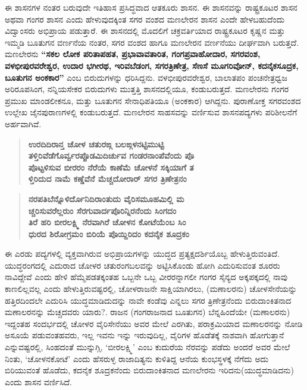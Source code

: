 ಈ ಶಾಸನಗಳ ನಂತರ ಬರುವುದೇ ಇತಿಹಾಸ ಪ್ರಸಿದ್ಧವಾದ ಆತಕೂರು ಶಾಸನ. ಈ ಶಾಸನವನ್ನು ರಾಷ್ಟ್ರಕೂಟರ ಶಾಸನ ಅಥವಾ ಗಂಗರ ಶಾಸನ ಎಂದು ಹೇಳುವುದಕ್ಕಿಂತ ಸಗರ ವಂಶದ ಮಣಲೇರನ ಶಾಸನ ಎಂದೇ ಹೇಳಬಹುದೆಂದು ವಿದ್ವಾಂಸರು ಅಭಿಪ್ರಾಯ ಪಡುತ್ತಾರೆ. ಈ ಶಾಸನದಲ್ಲಿ ಮೊದಲಿಗೆ ಚಕ್ರವರ್ತಿಯಾದ ರಾಷ್ಟ್ರಕೂಟರ ಕೃಷ್ಣನ ಮತ್ತು ಇಮ್ಮಡಿ ಬೂತುಗನ ವರ್ಣನೆಯ ನಂತರ, ಸಗರ ವಂಶದ ಹಾಗೂ ಮಣಲೇರನ ವರ್ಣನೆಯು ದೀರ್ಘವಾಗಿ ಬರುತ್ತದೆ. ಮಣಲೇರನು \textbf{“ಸಕಲ ಲೋಕ ಪರಿತಾಪಹತ, ಪ್ರಭಾವಾವತಾರಿತ, ಗಂಗಪ್ರವಾಹೋದಾರ, ಸಗರವಂಶ, ವಳಭೀಪುರವರೇಶ್ವರ, ಉದಾರ ಭಗೀರಥ, ಇರಿವಬೆಡಂಗ, ಸಗರತ್ರಿಣೇತ್ರ, ಸೆಣಸೆ ಮೂಗರಿವೋನ್​, ಕದನೈಕಸೂದ್ರಕ, ಬೂತುಗನ ಅಂಕಕಾರ”} ಎಂಬ ಬಿರುದುಗಳನ್ನು ಧರಿಸಿದ್ದನು. ವಳಭೀಪುರವರೇಶ್ವರ, ಬಾಲಾತಪಂ ಪಂಚನೇತ್ರಧ್ವಜ ಅರಿರೂಪಸಿಂಗ, ನನ್ನಿಯಸೇಕರ ಬಿರುದುಗಳು ಮುತ್ತತ್ತಿ ಶಾಸನದಲ್ಲಿಯೂ, ಕಂಡುಬರುತ್ತದೆ. ಮಣಲೇರನು ಗಂಗರ ಪ್ರಮುಖ ಮಾಂಡಲೀಕನೂ, ಮತ್ತು ಬೂತುಗನ ಸೇನಾಧಿಪತಿಯೂ (ಅಂಕಕಾರ) ಆಗಿದ್ದನು. ಪುರಾಣೋಕ್ತ ಸಗರವಂಶದ ಉಲ್ಲೇಖ ಜೈನಪುರಾಣಗಳಲ್ಲಿ ಕಂಡುಬರುತ್ತದೆ. ಮಣಲೇರನ ಸಾಹಸವನ್ನು ವರ್ಣಿಸುವ ಶಾಸನಪದ್ಯಗಳು ಪರಿಶೀಲನೆಗೆ ಅರ್ಹವಾಗಿವೆ.

\begin{verse}
\textbf{ಉರದಿದಿರಾನ್ತ ಚೋಳ ಚತುರಙ್ಗ ಬಲಙ್ಗಳನಟ್ಟಿಮುಟ್ಟಿ} \\\textbf{ತಳ್ತಿರಿವೆಡೆಗೊರ್ವ್ವರಪ್ಪೊಡಮಿದಿರ್ಚುವ ಗಂಡರನಾಂಪೆವೆಂದು ಪೊ} \\\textbf{ಪೊಟ್ಟಳಿಸುವ ಬೀರರಂ ನೆರೆಯೆ ಕಾಣೆಮೆ ಚೋಳನೆ ಸಕ್ಕಿಯಾಗೆ ತ} \\\textbf{ಳ್ತಿರಿದುದ ನಾಮೆ ಕಣ್ಡೆವೆನೆ ಮೆಚ್ಚದೋರಾರ್​ ಸಗರ ತ್ರಿಣೇತ್ರನಂ}
\end{verse}

\begin{verse}
\textbf{ನರಪತಿಬೆನ್ನೊಳಿರ್ದೊನಿದಿರಾಂತುದು ವೈರಿಸಮೂಹಮಿಲ್ಲಿ ಮ} \\\textbf{ಚ್ಚರಿಸುವರೆಲ್ಲರುಂ ಸೆರಗುವಾರ್ದಪೊರಿನ್ನಿರನೆಂದು ಸಿಂಗದಂ} \\\textbf{ತಿರೆ ಹರಿ ಬೀರಲಕ್ಷ್ಮಿ ನೆರವಾಗಿರೆ ಚೋಳನ ಕೋಟೆಯೆಂಬ ಸಿಂ} \\\textbf{ಧುರದ ಶಿರೋಗ್ರಮಂ ಬಿರಿಯೆ ಪೊಯ್ದಿರಿದಂ ಕದನೈಕ ಶೂದ್ರಕಂ}
\end{verse}

ಈ ಎರಡು ಪದ್ಯಗಳಲ್ಲಿ ವ್ಯಕ್ತವಾಗಿರುವ ಅಭಿಪ್ರಾಯಗಳನ್ನು ಯುದ್ಧದ ಪ್ರತ್ಯಕ್ಷದರ್ಶಿಯೊಬ್ಬ ಹೇಳುತ್ತಿರುವಂತಿದೆ. ಯುದ್ಧರಂಗದಲ್ಲಿ ಎದುರಾದ ಚೋಳರ ಚತುರಂಗಬಲವನ್ನು ಅಟ್ಟಿಸಿಕೊಂಡು ಹೋಗಿ ಎದುರಿಸುವಂತ ಶೂರರು ನಾವಿದ್ದೇವೆ ಎಂದು ಹೇಳಿ ಹೆಮ್ಮೆಪಡತಕ್ಕಂತಹ ಒಬ್ಬನೇ ಒಬ್ಬ ವೀರರನ್ನಾಗಲೀ ಗಂಗರ ಸೈನ್ಯದ ಅಕ್ಕಪಕ್ಕದಲ್ಲಿ ನಾವು ಕಾಣಲಿಲ್ಲವಲ್ಲ ಎಂದು ಹೇಳುತ್ತಿರುವಷ್ಟರಲ್ಲಿ, ಚೋಳರಾಜನೇ ಸಾಕ್ಷಿಯಾಗಿರಲು, (ಮಣಾಲರನು) ಚೋಳಸೇನೆಯನ್ನು ಹತ್ತಿರದಿಂದಲೇ ಎದುರಿಸಿ ಯುದ್ಧಮಾಡಿದುದನ್ನು ನಾವೇ ಕಂಡೆವು ಎನ್ನಲು ಸಗರ ತ್ರಿಣೇತ್ರನೆಂದು ಬಿರುದಾಂಕಿತನಾದ ಮಣಾಲರನನ್ನು ಮೆಚ್ಚದವರು ಯಾರು?. ರಾಜನ (ಗಂಗರಾಜನಾದ ಬೂತುಗನ) ಬೆನ್ನಹಿಂದೆಯೇ (ಮಣಾಲರನು) ಇದ್ದಂತಹ ಸಂದರ್ಭದಲ್ಲಿ ಚೋಳರ ವೈರಿಸೇನೆಯು ಅವರ ಮೇಲೆ ಎರಗಿತು, ಪರಾಕ್ರಮಿಯಾದ ಮಣಾಲರನನ್ನು ನೋಡಿ ಅಸೂಯೆ ಪಡುವಂತಹವರು, ಇಲ್ಲ ಇವನು ಇನ್ನು ಇರುವುದಿಲ್ಲ, ವೈರಿಗಳ ಹೊಡೆತಕ್ಕೆ ನಾಶವಾಗಿ ಹೋಗುತ್ತಾನೆ ಎನ್ನುವಷ್ಟರಲ್ಲಿ, ಸಿಂಹದಂತೆ ಮುನ್ನುಗ್ಗಿ, `ಬೀರಲಕ್ಷ್ಮಿ' ಎಂಬ ಕುದುರೆಯ ನೆರವನ್ನು ಪಡೆದು ಅಂದರೆ ಅವರ ಮೇಲೆ ನಿಂತು, `ಚೋಳನಕೋಟೆ' ಎಂದು ಹೆಸರುಳ್ಳ ರಾಜಾದಿತ್ಯನು ಕುಳಿತಿದ್ದ ಆನೆಯ ಕುಂಭಸ್ಥಳಕ್ಕೆ ನೆಗೆದು ಅದು ಬಿರಿಯುವಂತೆ ಹೊಡೆದು, ಕದನೈಕ ಶೂದ್ರಕನೆಂದು ಬಿರುದಾಂಕಿತನಾದ ಮಣಲೇರನು ಇರಿದನು(ಯುದ್ಧಮಾಡಿದನು) ಎಂದು ಶಾಸನ ವರ್ಣಿಸಿದೆ.

